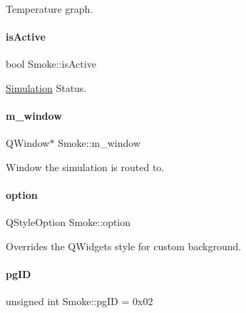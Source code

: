 Temperature graph. 

\mbox{\label{classSmoke_a83c338b4ec7a3d71443e8f1fd9d7a1b5}} 
\paragraph{\texorpdfstring{isActive}{isActive}}
{\footnotesize\ttfamily bool Smoke\+::is\+Active\hspace{0.3cm}{\ttfamily [private]}}



\mbox{\hyperlink{classSimulation}{Simulation}} Status. 

\mbox{\label{classSmoke_a75cc318af83d2cf39a6609b8becafe38}} 
\paragraph{\texorpdfstring{m\_window}{m\_window}}
{\footnotesize\ttfamily Q\+Window$\ast$ Smoke\+::m\+\_\+window\hspace{0.3cm}{\ttfamily [private]}}



Window the simulation is routed to. 

\mbox{\label{classSmoke_adaf76ba29af2bc7105de57280a7e0993}} 
\paragraph{\texorpdfstring{option}{option}}
{\footnotesize\ttfamily Q\+Style\+Option Smoke\+::option\hspace{0.3cm}{\ttfamily [private]}}



Overrides the Q\+Widget\textquotesingle{}s style for custom background. 

\mbox{\label{classSmoke_a85ac4d6389daf0b33572436f18141397}} 
\paragraph{\texorpdfstring{pgID}{pgID}}
{\footnotesize\ttfamily unsigned int Smoke\+::pg\+ID = 0x02}



